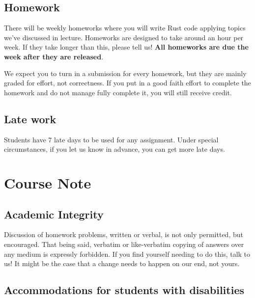 \documentclass{article}
\begin{document}
\subsection*{Homework}
 
There will be weekly homeworks where you will write Rust code applying topics we've
discussed in lecture.
Homeworks are designed to take around an hour per week. If they take longer than this, please tell us!
\textbf{All homeworks are due the week after they are released}.

We expect you to turn in a submission for every homework, but they are mainly graded
for effort, not correctness. If you put in a good faith effort to complete the homework
and do not manage fully complete it, you will still receive credit.


\subsection*{Late work}

Students have 7 late days to be used for any assignment. 
Under special circumstances, if you let us know in advance, you can get more late days.


\section*{Course Note}

\subsection*{Academic Integrity}

Discussion of homework problems, written or verbal, is not only permitted, but encouraged. 
That being said, verbatim or like-verbatim copying of answers over any medium is expressly forbidden.
If you find yourself needing to do this, talk to us! 
It might be the case that a change needs to happen on our end, not yours.


\subsection*{Accommodations for students with disabilities}
\end{document}
